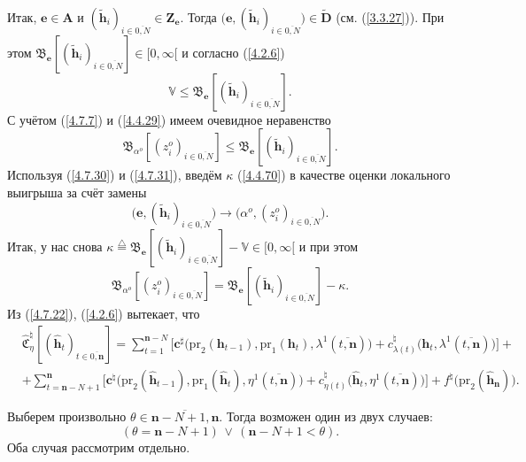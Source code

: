 \documentclass[12pt,twoside]{report}
\newcommand{\bfn}{\begin{equation}}
\newcommand{\efn}{\end{equation}}
\newcommand{\df}{\stackrel{\triangle}{=}}
\newcommand{\ov}{\overline}
\newcommand{\la}{\lambda}
\newcommand{\al}{\alpha}
\newcommand{\bbv}{{\mathbb V}}
\newcommand{\zc}{{\mathbf c}}
\newcommand{\nn}{{\mathbf n}}
\begin{document}
{{Итак, $\mathbf{e}\in \mathbf{A}$ и $(\tilde{\mathbf{h}}_i)_{i\in\ov{0,N}}\in
\mathbf{Z}_\mathbf{e}.$ Тогда $\bigl(\mathbf{e},(\tilde{\mathbf{h}}_i)_{i\in\ov{0,N}}\bigl)\in
\widetilde{\mathbf{D}}$ (см.  (\ref{3.3.27})). При этом
$\mathfrak{B}_\mathbf{e}[(\tilde{\mathbf{h}}_i)_{i\in\ov{0,N}}]\in [0,\infty[$ и согласно (\ref{4.2.6})
\bfn\label{4.7.30}\bbv\leqslant \mathfrak{B}_\mathbf{e}[(\tilde{\mathbf{h}}_i)_{i\in\ov{0,N}}].
\efn
С учётом (\ref{4.7.7}) и (\ref{4.4.29}) имеем очевидное неравенство
\bfn\label{4.7.31}\mathfrak{B}_{\al^o}[(z_i^o)_{i\in\ov{0,N}}] \leqslant
\mathfrak{B}_\mathbf{e}[(\tilde{\mathbf{h}}_i)_{i\in\ov{0,N}}].
\efn
Используя (\ref{4.7.30}) и (\ref{4.7.31}), введём $\kappa$ (\ref{4.4.70}) в
качестве оценки локального выигрыша за счёт замены
$$\bigl(\mathbf{e},(\tilde{\mathbf{h}}_i)_{i\in\ov{0,N}}\bigl) \longrightarrow \bigl(\al^o,
(z_i^o)_{i\in\ov{0,N}}\bigl).
$$
Итак, у нас снова $\kappa \df \mathfrak{B}_\mathbf{e}[(\tilde{\mathbf{h}}_i)_{i\in\ov{0,N}}]-
\bbv \in [0,\infty[$  и при этом
\bfn\label{4.7.32}\mathfrak{B}_{\al^o}[(z_i^o)_{i\in\ov{0,N}}] =
\mathfrak{B}_\mathbf{e}[(\tilde{\mathbf{h}}_i)_{i\in\ov{0,N}}]- \kappa.
\efn
Из (\ref{4.7.22}), (\ref{4.2.6})
вытекает, что
\begin{eqnarray}
&\widehat{\mathfrak{C}}_\eta^\natural[(\hat{\mathbf{h}}_t)_{t\in\ov{0,\nn}}]=
\sum\limits_{t=1}^{\nn-N}\bigl[\zc^\sharp\bigl(\mathrm{pr}_2(\mathbf{h}_{t-1}),\mathrm{pr}_1
(\mathbf{h}_t),\la^1(\ov{t,\nn})\bigl) +c_{\la(t)}^\natural\bigl(\mathbf{h}_t,\la^1(\ov{t,\nn})\bigl)\bigl]+
&\nonumber\\
&+\sum\limits_{t=\nn-N+1}^\nn\bigl[\zc^\natural\bigl(\mathrm{pr}_2(\hat{\mathbf{h}}_{t-1}),
\mathrm{pr}_1(\hat{\mathbf{h}}_t),\eta^1(\ov{t,\nn})\bigl) +
c_{\eta(t)}^\natural\bigl(\hat{\mathbf{h}}_t,\eta^1(\ov{t,\nn})\bigl)\bigl] +
f^\natural\bigl(\mathrm{pr}_2(\hat{\mathbf{h}}_\nn)\bigl).
&\label{4.7.33}
\end{eqnarray}

Выберем произвольно $\theta\in\ov{\nn-N+1,\nn}.$ Тогда возможен один из двух случаев:
\bfn\label{4.7.38}(\theta =\nn-N+1)\,\vee\,(\nn-N+1< \theta).
\efn
Оба случая рассмотрим отдельно.

}}
\end{document}
